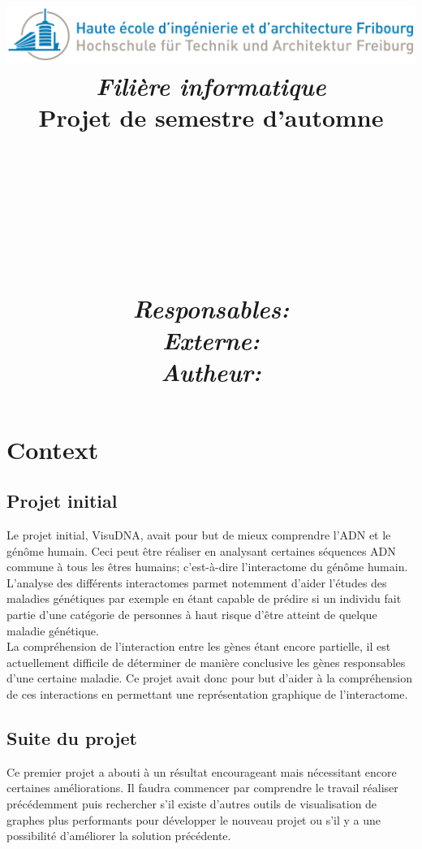 \documentclass{article}
\title{
  \includegraphics[width=0.9\columnwidth]{Logo_HEIA}\\
  \vspace{1cm}
  \textmd{\textit{Filière informatique}} \\
  \vspace{2cm}
  \textmd{Projet de semestre d'automne}\\
  \textmd{\projDate}\\
  \vspace{1.5cm}
  \noindent\makebox[\linewidth]{\rule{\textwidth}{0.5pt}}\\
  \vspace{.5cm}
  \textmd{\textbf{\projName}}\\
  \textmd{\textbf{\docTitle}}\\
  \noindent\makebox[\linewidth]{\rule{\textwidth}{0.5pt}}\\
  \Large
  \vspace{3cm}
  \textit{Responsables:} \projSupervisors \\
  \vspace{1cm}
  \textit{Externe:} \projInitiator \\
  \vspace{1cm}
  \textit{Autheur:} \projAuthorName \\
  \author{}
}
\date{} %
\begin{document}
\maketitle


 \newpage



\section{Context}
\subsection{Projet initial}
  Le projet initial, VisuDNA, avait pour but de mieux comprendre l'ADN et le génôme humain. Ceci peut être réaliser en analysant certaines séquences ADN commune à tous les êtres humains; c'est-à-dire l'interactome du génôme humain.  L'analyse des différents interactomes parmet notemment d'aider l'études des maladies génétiques par exemple en étant capable de prédire si un individu fait partie d'une catégorie de personnes à haut risque d'être atteint de quelque maladie génétique.
  \\
  La compréhension de l'interaction entre les gènes étant encore partielle, il est actuellement difficile de déterminer de manière conclusive les gènes responsables d'une certaine maladie. Ce projet avait donc pour but d'aider à la compréhension de ces interactions en permettant une représentation graphique de l'interactome.
\cite{Sisto:2014}

\subsection{Suite du projet}
  Ce premier projet a abouti à un résultat encourageant mais nécessitant encore certaines améliorations. Il faudra commencer par comprendre le travail réaliser précédemment puis rechercher s'il existe d'autres outils de visualisation de graphes plus performants pour développer le nouveau projet ou s'il y a une possibilité d'améliorer la solution précédente.
\end{document}
